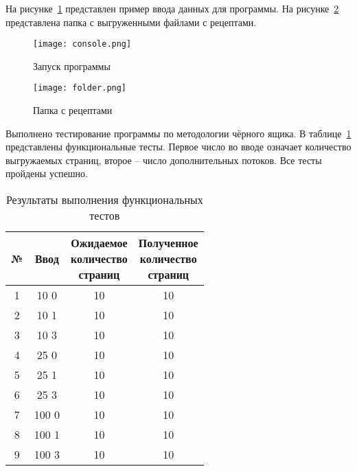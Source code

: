 На рисунке~\ref{fig:console} представлен пример ввода данных для программы. На рисунке~\ref{fig:folder} представлена папка с выгруженными файлами с рецептами. 

\begin{figure}[h!]
	\centering
	\texttt{[image: console.png]}
	\caption{\label{fig:console}Запуск программы}
\end{figure}

\begin{figure}[h!]
	\centering
	\texttt{[image: folder.png]}
	\caption{\label{fig:folder}Папка с рецептами}
\end{figure}



Выполнено тестирование программы по методологии чёрного ящика. В таблице~\ref{tab:tests} представлены функциональные тесты. Первое число во вводе означает количество выгружаемых страниц, второе -- число дополнительных потоков. Все тесты пройдены успешно.

\begin{table}[h!]
	\small
	\caption{\label{tab:tests}Результаты выполнения функциональных тестов}
	\begin{center}
		\begin{tabular}{|c|c|c|c|}
			\hline
			№  & Ввод & \makecell{Ожидаемое\\количество\\страниц} & \makecell{Полученное\\количество\\страниц} \\  
			\hline
			1 & 10 0 & 10 & 10 \\
			\hline
			2 & 10 1 & 10 & 10 \\
			\hline
			3 & 10 3 & 10 & 10 \\
			\hline
			4 & 25 0 & 10 & 10 \\
			\hline
			5 & 25 1 & 10 & 10 \\
			\hline
			6 & 25 3 & 10 & 10 \\
			\hline
			7 & 100 0 & 10 & 10 \\
			\hline
			8 & 100 1 & 10 & 10 \\
			\hline
			9 & 100 3 & 10 & 10 \\
			\hline
		\end{tabular}
	\end{center}
\end{table}


